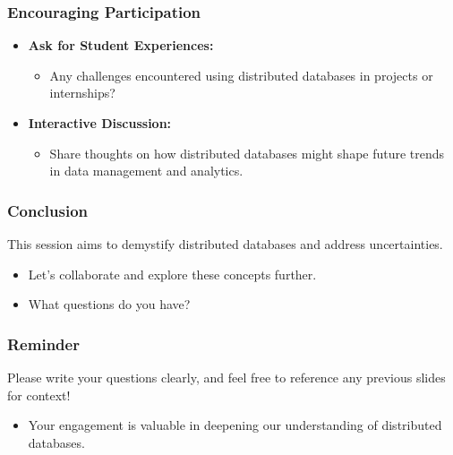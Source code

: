 \documentclass[aspectratio=169]{beamer}
\begin{document}
\begin{frame}[fragile]
  \frametitle{Encouraging Participation}
  \begin{itemize}
    \item \textbf{Ask for Student Experiences:} 
      \begin{itemize}
        \item Any challenges encountered using distributed databases in projects or internships?
      \end{itemize}
    
    \item \textbf{Interactive Discussion:} 
      \begin{itemize}
        \item Share thoughts on how distributed databases might shape future trends in data management and analytics.
      \end{itemize}
  \end{itemize}
\end{frame}

\begin{frame}[fragile]
  \frametitle{Conclusion}
  This session aims to demystify distributed databases and address uncertainties. 
  \begin{itemize}
    \item Let's collaborate and explore these concepts further. 
    \item What questions do you have?
  \end{itemize}
\end{frame}

\begin{frame}[fragile]
  \frametitle{Reminder}
  Please write your questions clearly, and feel free to reference any previous slides for context! 
  \begin{itemize}
    \item Your engagement is valuable in deepening our understanding of distributed databases.
  \end{itemize}
\end{frame}
\end{document}
